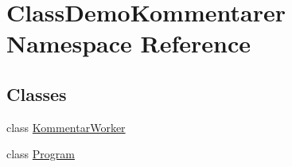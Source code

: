 \hypertarget{namespace_class_demo_kommentarer}{}\section{Class\+Demo\+Kommentarer Namespace Reference}
\label{namespace_class_demo_kommentarer}
\subsection*{Classes}
\begin{DoxyCompactItemize}
\item 
class \mbox{\hyperlink{class_class_demo_kommentarer_1_1_kommentar_worker}{Kommentar\+Worker}}
\item 
class \mbox{\hyperlink{class_class_demo_kommentarer_1_1_program}{Program}}
\end{DoxyCompactItemize}
